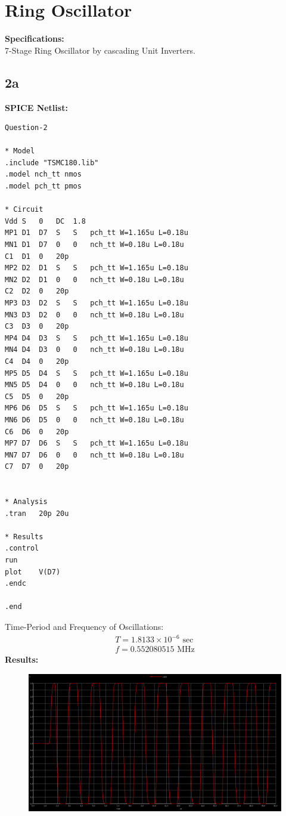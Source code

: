 \documentclass{article}
\begin{document}
\section{Ring Oscillator}
\textbf{Specifications:}\\
7-Stage Ring Oscillator by cascading Unit Inverters.
\subsection{2a}
\textbf{SPICE Netlist:}
\begin{lstlisting}
Question-2

* Model
.include "TSMC180.lib"
.model nch_tt nmos
.model pch_tt pmos

* Circuit
Vdd	S	0	DC	1.8
MP1	D1	D7	S	S	pch_tt W=1.165u L=0.18u
MN1	D1	D7	0	0	nch_tt W=0.18u L=0.18u
C1	D1	0	20p
MP2	D2	D1	S	S	pch_tt W=1.165u L=0.18u
MN2	D2	D1	0	0	nch_tt W=0.18u L=0.18u
C2	D2	0	20p
MP3	D3	D2	S	S	pch_tt W=1.165u L=0.18u
MN3	D3	D2	0	0	nch_tt W=0.18u L=0.18u
C3	D3	0	20p
MP4	D4	D3	S	S	pch_tt W=1.165u L=0.18u
MN4	D4	D3	0	0	nch_tt W=0.18u L=0.18u
C4	D4	0	20p
MP5	D5	D4	S	S	pch_tt W=1.165u L=0.18u
MN5	D5	D4	0	0	nch_tt W=0.18u L=0.18u
C5	D5	0	20p
MP6	D6	D5	S	S	pch_tt W=1.165u L=0.18u
MN6	D6	D5	0	0	nch_tt W=0.18u L=0.18u
C6	D6	0	20p
MP7	D7	D6	S	S	pch_tt W=1.165u L=0.18u
MN7	D7	D6	0	0	nch_tt W=0.18u L=0.18u
C7	D7	0	20p


* Analysis
.tran	20p	20u

* Results
.control
run
plot	V(D7)
.endc

.end
\end{lstlisting}
Time-Period and Frequency of Oscillations:\\
\begin{align}
    T = 1.8133 \times 10^{-6} \text{ sec}\\
    f = 0.552080515 \text{ MHz}
\end{align}
\textbf{Results:}\\
\begin{figure}[!ht]
    \centering
    \includegraphics[scale=0.23]{Images/2a.png}
\end{figure}\\
\end{document}
